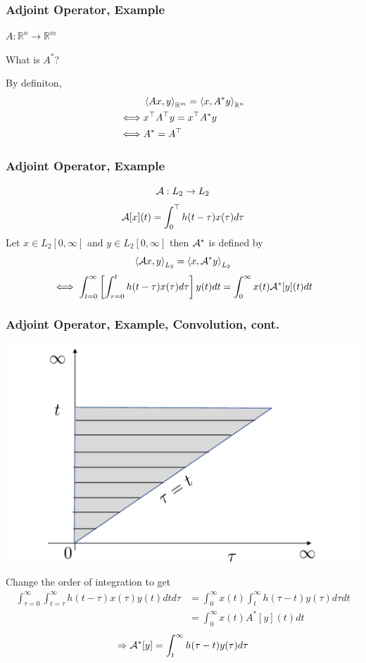 \documentclass{beamer}
\begin{document}
\begin{frame}\frametitle{Adjoint Operator, Example}
	\begin{example}
		$A:\mathbb{R}^n \to \mathbb{R}^m$
		
		\vspace{0.5cm}
		What is $A^\ast$?
		\vspace{0.5cm}
		
		By definiton, 
			\begin{align*}
				& \left<Ax,y \right>_{\mathbb{R}^m} = \left<x,A^\ast y \right>_{\mathbb{R}^n} \\
				\iff & x^\top A^\top y = x^\top A^\ast y \\
				\iff & A^\ast = A^\top
			\end{align*}
	\end{example}
\end{frame}

\begin{frame}\frametitle{Adjoint Operator, Example}
	\begin{example}[Convolution]
		\[ \mathcal{A}:L_2 \to L_2 \]
		\[ \mathcal{A}[x](t) = \int_{0}^\top h(t-\tau) x(\tau) d\tau \]
		Let $x \in L_2[0,\infty]$ and $y \in L_2[0,\infty]$ then $\mathcal{A}^\ast$ is defined by
		\[ \left<\mathcal{A} x,y \right>_{L_2} = \left<x,\mathcal{A}^\ast y \right>_{L_2} 
		\]
		\[ \iff \int_{t=0}^{\infty} \left[ \int_{\tau = 0}^t h(t-\tau)x(\tau)d\tau \right] y(t) dt = \int_0^{\infty}x(t)\mathcal{A}^\ast[y](t)dt \]
	\end{example}
\end{frame}

\begin{frame}\frametitle{Adjoint Operator, Example, Convolution, cont.}
	\begin{center}
	\includegraphics{figures/chap4_order_of_integration}
	\end{center}

	Change the order of integration to get
	\begin{align*}
	\int_{\tau=0}^{\infty} \int_{t=\tau}^{\infty} h(t-\tau)x(\tau)y(t)dt d\tau &= \int_0^{\infty} x(t) \int_t^{\infty} h(\tau - t) y(\tau) d\tau dt\\
	&= \int_0^{\infty} x(t)A^\ast[y](t)dt
	\end{align*}
	\[ \Rightarrow \mathcal{A}^\ast[y] = \int_t^{\infty}h(\tau - t)y(\tau)d\tau \]
\end{frame}
\end{document}

